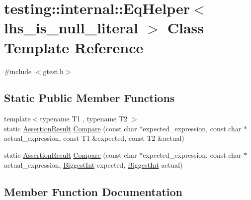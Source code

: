 \hypertarget{classtesting_1_1internal_1_1_eq_helper}{}\section{testing\+:\+:internal\+:\+:Eq\+Helper$<$ lhs\+\_\+is\+\_\+null\+\_\+literal $>$ Class Template Reference}
\label{classtesting_1_1internal_1_1_eq_helper}


{\ttfamily \#include $<$gtest.\+h$>$}

\subsection*{Static Public Member Functions}
\begin{DoxyCompactItemize}
\item 
{\footnotesize template$<$typename T1 , typename T2 $>$ }\\static \hyperlink{classtesting_1_1_assertion_result}{Assertion\+Result} \hyperlink{classtesting_1_1internal_1_1_eq_helper_ac2977ed90cd3c88607f804e43b86b92c}{Compare} (const char $\ast$expected\+\_\+expression, const char $\ast$actual\+\_\+expression, const T1 \&expected, const T2 \&actual)
\item 
static \hyperlink{classtesting_1_1_assertion_result}{Assertion\+Result} \hyperlink{classtesting_1_1internal_1_1_eq_helper_a3de996954b41d484c065ed824fe7eac9}{Compare} (const char $\ast$expected\+\_\+expression, const char $\ast$actual\+\_\+expression, \hyperlink{namespacetesting_1_1internal_a05c6bd9ede5ccdf25191a590d610dcc6}{Biggest\+Int} expected, \hyperlink{namespacetesting_1_1internal_a05c6bd9ede5ccdf25191a590d610dcc6}{Biggest\+Int} actual)
\end{DoxyCompactItemize}


\subsection{Member Function Documentation}
\hypertarget{classtesting_1_1internal_1_1_eq_helper_ac2977ed90cd3c88607f804e43b86b92c}{}
